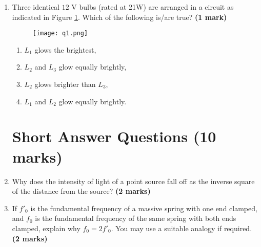 \begin{enumerate}
\renewcommand{\figurename}{Figure}
\newpage
\item Three identical $12$ V bulbs (rated at 21W) are arranged in a circuit as indicated in Figure \ref{bulbGlow}. Which of the following is/are true? \hfill \textbf{(1 mark)}


\renewcommand{\figurename}{\hspace{5cm} Figure}
\vspace{-0.5cm}
\begin{figure}[!htb]
\hspace{4cm}
\centering
\texttt{[image: q1.png]}
\caption{}
\label{bulbGlow}
\end{figure}

\vspace{-5cm}

\begin{enumerate}
\item $L_1$ glows the brightest,
\item $L_2$ and $L_3$ glow equally brightly,
\item $L_2$ glows brighter than $L_3$,
\item $L_1$ and $L_2$ glow equally brightly.
\end{enumerate}

\vspace{2.5cm}
\renewcommand{\figurename}{Figure}

\section*{Short Answer Questions \hfill (10 marks)}








\item Why does the intensity of light of a point source fall off as the inverse square of the distance from the source? \hfill \textbf{(2 marks)}


\item If $f'_0$ is the fundamental frequency of a massive spring with one end clamped, and $f_0$ is the fundamental frequency of the same spring with both ends clamped, explain why $f_0 = 2 f'_0$. You may use a suitable analogy if required. \hfill \textbf{(2 marks)}


\end{enumerate}
